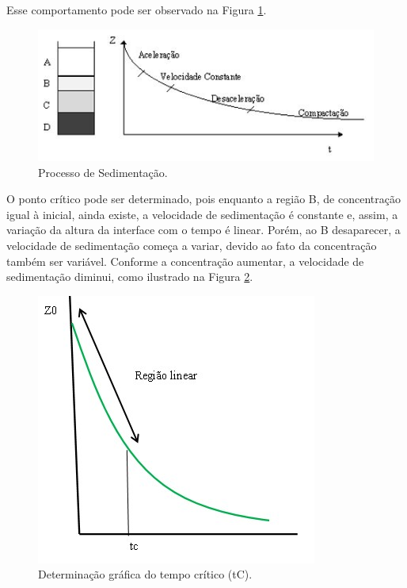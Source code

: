 Esse comportamento pode ser observado na Figura \ref{sedimentaP}.


\begin{figure}[H]
	\begin{center}
		\includegraphics[scale=.8,trim={0 0 0 0}]{figuras/ladeq/sedi/graphProv}
		\caption{Processo de Sedimentação.}
		\label{sedimentaP}
	\end{center}
\end{figure}

O ponto crítico pode ser determinado, pois enquanto a região B, de concentração igual à inicial, ainda existe, a velocidade de sedimentação é constante e, assim, a variação da altura da interface com o tempo é linear. Porém, ao B desaparecer, a velocidade de sedimentação começa a variar, devido ao fato da concentração também ser variável. Conforme a concentração aumentar, a velocidade de sedimentação diminui, como ilustrado na Figura \ref{linearReg}.


\begin{figure}[H]
	\begin{center}
		\includegraphics[scale=.5,trim={0 0 0 0}]{figuras/ladeq/sedi/graphProv2}
		\caption{Determinação gráfica do tempo crítico (tC).}
		\label{linearReg}
	\end{center}
\end{figure}

